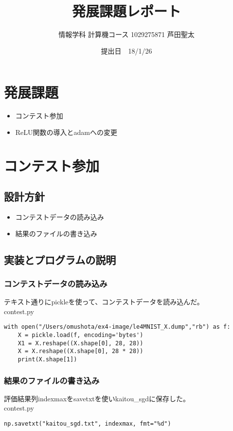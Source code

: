 \documentclass{ujarticle}
\title {発展課題レポート}
\author{情報学科 計算機コース 1029275871 芦田聖太}
\date{提出日　18/1/26}
\begin{document}
\begin{titlepage}
\maketitle
\thispagestyle{empty}
\end{titlepage}



\section*{発展課題}
\begin{itemize}
\item コンテスト参加
\item ReLU関数の導入とadamへの変更
\end{itemize}

\section{コンテスト参加}
\subsection{設計方針}
\begin{itemize}
\item コンテストデータの読み込み
\item 結果のファイルの書き込み
\end{itemize}

\subsection{実装とプログラムの説明}
\subsubsection{コンテストデータの読み込み}
テキスト通りにpickleを使って、コンテストデータを読み込んだ。\\
contest.py
\begin{lstlisting}[basicstyle=\ttfamily\footnotesize, frame=single]
with open("/Users/omushota/ex4-image/le4MNIST_X.dump","rb") as f:
    X = pickle.load(f, encoding='bytes')
    X1 = X.reshape((X.shape[0], 28, 28))
    X = X.reshape((X.shape[0], 28 * 28))
    print(X.shape[1])
\end{lstlisting}

\subsubsection{結果のファイルの書き込み}
評価結果列indexmaxをsavetxtを使いkaitou\_sgdに保存した。\\
contest.py
\begin{lstlisting}[basicstyle=\ttfamily\footnotesize, frame=single]
np.savetxt("kaitou_sgd.txt", indexmax, fmt="%d")
\end{lstlisting}
\end{document}

